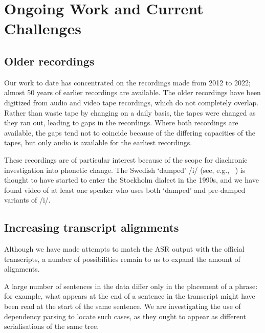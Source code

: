 \documentclass{Interspeech}
\begin{document}
\section{Ongoing Work and Current Challenges}


\subsection{Older recordings}

Our work to date has concentrated on the recordings made from 2012 to 2022; almost 50 years of earlier recordings are available. The older recordings have been digitized from audio and video tape recordings, which do not completely overlap. Rather than waste tape by changing on a daily basis, the tapes were changed as they ran out, leading to gaps in the recordings. Where both recordings are available, the gaps tend not to coincide because of the differing capacities of the tapes, but only audio is available for the earliest recordings.

These recordings are of particular interest because of the scope for diachronic investigation into phonetic change. The Swedish `damped' /i/ (see, e.g., ~\cite{bjorsten1999swedish}) is thought to have started to enter the Stockholm dialect in the 1990s, and we have found video of at least one speaker who uses both `damped' and pre-damped variants of /i/.


\subsection{Increasing transcript alignments}

Although we have made attempts to match the ASR output with the official transcripts, a number of possibilities remain to us to expand the amount of alignments.

A large number of sentences in the data differ only in the placement of a phrase: for example, what appears at the end of a sentence in the transcript might have been read at the start of the same sentence. We are investigating the use of dependency parsing to locate such cases, as they ought to appear as different serialisations of the same tree.
\end{document}
